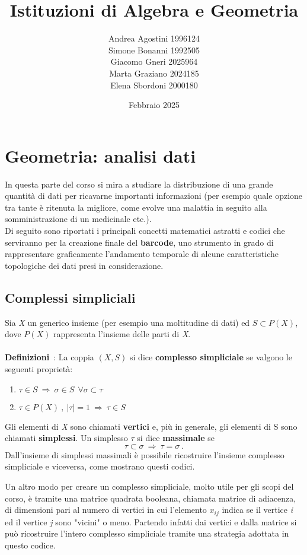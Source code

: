 \documentclass{article}
\title{Istituzioni di Algebra e Geometria}
\author{Andrea Agostini 1996124\\ Simone Bonanni 1992505
	\\Giacomo Gneri 2025964
	\\ Marta Graziano 2024185
	\\ Elena Sbordoni 2000180}
\date{Febbraio 2025}
\begin{document}
	
	\maketitle
	\newpage
	\tableofcontents
	\newpage
	\section{Geometria: analisi dati}
	In questa parte del corso si mira a studiare la distribuzione di una grande quantità di dati per ricavarne importanti informazioni (per esempio quale opzione tra tante è ritenuta la migliore, come evolve una malattia in seguito alla somministrazione di un medicinale etc.).\\ Di seguito sono riportati i principali concetti matematici astratti e codici che serviranno per la creazione finale del \textbf{barcode}, uno strumento in grado di rappresentare graficamente l'andamento temporale di alcune caratteristiche topologiche dei dati presi in considerazione.
	
	\subsection{Complessi simpliciali}
	Sia \textit{X} un generico insieme (per esempio una moltitudine di dati) ed \(S\subset P(X)\), dove \(P(X)\) rappresenta l'insieme delle parti di \textit{X}.\\ \\ \textbf{Definizioni}\ : La coppia \((X,S)\) si dice \textbf{complesso simpliciale} se valgono le seguenti proprietà:
	\begin{enumerate}
		\item \(\tau \in S\ \Rightarrow\  \sigma\in S\ \  \forall\sigma\subset\tau\)  
		\item \(\tau\in P(X)\ ,\ |\tau|=1\ \Rightarrow \ \tau\in S\)
	\end{enumerate}
	Gli elementi di \textit{X} sono chiamati \textbf{vertici} e, più in generale, gli elementi di S sono chiamati \textbf{simplessi}. Un simplesso \(\tau\) si dice \textbf{massimale} se \[\tau\subset\sigma \ \Rightarrow\ \tau =\sigma\ .\]
	Dall'insieme di simplessi massimali è possibile ricostruire l'insieme complesso simpliciale e viceversa, come mostrano questi codici.
	\vspace{1cm}
	
	\vspace{1cm}
	
	\vspace{1cm}
	 Un altro modo per creare un complesso simpliciale, molto utile per gli scopi del corso, è tramite una matrice quadrata booleana, chiamata matrice di adiacenza, di dimensioni pari al numero di vertici in cui l'elemento \(x_{ij}\) indica se il vertice \textit{i} ed il vertice \textit{j} sono "vicini" o meno. Partendo infatti dai vertici e dalla matrice si può ricostruire l'intero complesso simpliciale tramite una strategia adottata in questo codice.
	 \vspace{1cm}
	 
	 \vspace{1cm}
\end{document}
